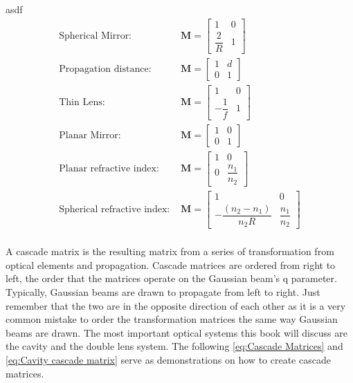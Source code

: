 \documentclass[11pt,a4paper]{book}
\begin{document}
		asdf
		\begin{equation}
		\label{eq:transformation matrices}
		\begin{split}
		\text{Spherical Mirror: }& \textbf{M} =
		\begin{bmatrix}
		1 & 0 \\
		\dfrac{2}{R} & 1  
		\end{bmatrix} \\
		\text{Propagation distance: }& \textbf{M} =
		\begin{bmatrix}
		1 & d \\
		0 & 1  
		\end{bmatrix}\\
		\text{Thin Lens: } & \textbf{M} = 
		\begin{bmatrix}
		1 & 0 \\
		-\dfrac{1}{f} & 1  
		\end{bmatrix}\\
		\text{Planar Mirror: } & \textbf{M} = 
		\begin{bmatrix}
		1 & 0 \\
		0 & 1  
		\end{bmatrix} \\
		\text{Planar refractive index: } & \textbf{M} = 
		\begin{bmatrix}
		1 & 0 \\
		0 & \dfrac{n_1}{n_2}  
		\end{bmatrix} \\
		\text{Spherical refractive index: } & \textbf{M} = 
		\begin{bmatrix}
		1 & 0 \\
		-\dfrac{(n_2-n_1)}{n_2R} & \dfrac{n_1}{n_2}  
		\end{bmatrix} \\
		\end{split}
		\end{equation}
		
		\noindent A cascade matrix is the resulting matrix from a series of transformation from optical elements and propagation. Cascade matrices are ordered from right to left, the order that the matrices operate on the Gaussian beam's q parameter. Typically, Gaussian beams are drawn to propagate from left to right. Just remember that the two are in the opposite direction of each other as it is a very common mistake to order the transformation matrices the same way Gaussian beams are drawn. The most important optical systems this book will discuss are the cavity and the double lens system. The following \autoref{eq:Cascade Matrices} and \autoref{eq:Cavity cascade matrix} serve as demonstrations on how to create cascade matrices.
		
\end{document}
